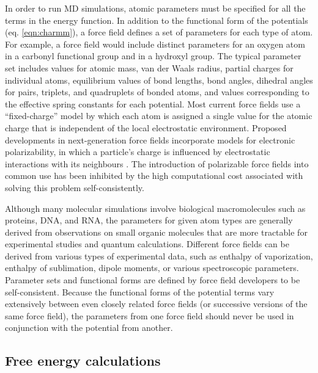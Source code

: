 In order to run MD simulations, atomic parameters must be specified for all the terms in the energy function. In addition to the functional form of the potentials (eq. \ref{eqn:charmm}), a force field defines a set of parameters for each type of atom. For example, a force field would include distinct parameters for an oxygen atom in a carbonyl functional group and in a hydroxyl group. The typical parameter set includes values for atomic mass, van der Waals radius, partial charges for individual atoms, equilibrium values of bond lengths, bond angles, dihedral angles for pairs, triplets, and quadruplets of bonded atoms, and values corresponding to the effective spring constants for each potential. Most current force fields use a ``fixed-charge'' model by which each atom is assigned a single value for the atomic charge that is independent of the local electrostatic environment. Proposed developments in next-generation force fields incorporate models for electronic polarizability, in which a particle's charge is influenced by electrostatic interactions with its neighbours \cite{Patel:2004p6622,Patel:2004p6626}. The introduction of polarizable force fields into common use has been inhibited by the high computational cost associated with solving this problem self-consistently.

Although many molecular simulations involve biological macromolecules such as proteins, DNA, and RNA, the parameters for given atom types are generally derived from observations on small organic molecules that are more tractable for experimental studies and quantum calculations. Different force fields can be derived from various types of experimental data, such as enthalpy of vaporization, enthalpy of sublimation, dipole moments, or various spectroscopic parameters. Parameter sets and functional forms are defined by force field developers to be self-consistent. Because the functional forms of the potential terms vary extensively between even closely related force fields (or successive versions of the same force field), the parameters from one force field should never be used in conjunction with the potential from another.

\subsection{Free energy calculations}

